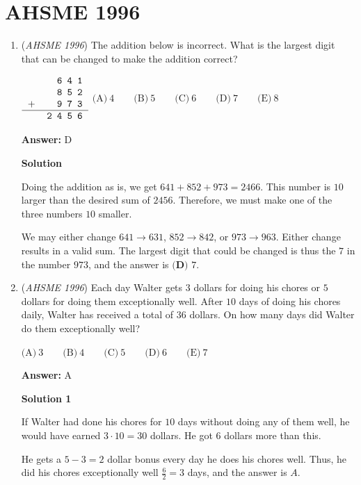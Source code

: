 \section{AHSME 1996}
        \begin{enumerate}
        	\item (\textit{AHSME 1996}) The addition below is incorrect. What is the largest digit that can be changed to make the addition correct?


 $\begin{tabular}{rr}&\ \texttt{6 4 1}\\ &\texttt{8 5 2}\\ +&\texttt{9 7 3}\\ \hline  &\texttt{2 4 5 6}\end{tabular}$
$\text{(A)}\ 4\qquad\text{(B)}\ 5\qquad\text{(C)}\ 6\qquad\text{(D)}\ 7\qquad\text{(E)}\ 8$

 \textbf{Answer: }D



\textbf{Solution}

Doing the addition as is, we get $641 + 852 + 973 = 2466$.  This number is $10$ larger than the desired sum of $2456$.  Therefore, we must make one of the three numbers $10$ smaller.

 We may either change $641 \rightarrow 631$, $852 \rightarrow 842$, or $973 \rightarrow 963$.  Either change results in a valid sum.  The largest digit that could be changed is thus the $7$ in the number $973$, and the answer is $\boxed{\textbf{(D) }7}$.

 


	\item (\textit{AHSME 1996}) Each day Walter gets $3$ dollars for doing his chores or $5$ dollars for doing them exceptionally well. After $10$ days of doing his chores daily, Walter has received a total of $36$ dollars. On how many days did Walter do them exceptionally well?


 $\text{(A)}\ 3\qquad\text{(B)}\ 4\qquad\text{(C)}\ 5\qquad\text{(D)}\ 6\qquad\text{(E)}\ 7$

 \textbf{Answer: }A



\textbf{Solution 1}

If Walter had done his chores for $10$ days without doing any of them well, he would have earned $3 \cdot 10 = 30$ dollars.  He got $6$ dollars more than this.

 He gets a $5 - 3 = 2$ dollar bonus every day he does his chores well.  Thus, he did his chores exceptionally well $\frac{6}{2} = 3$ days, and the answer is $\boxed{A}$.


\end{enumerate}
